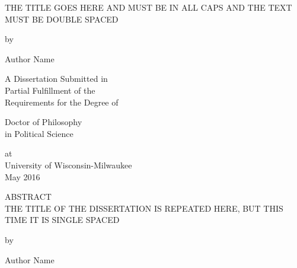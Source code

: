 \documentclass[12pt]{article}
\begin{document}

\doublespacing
\thispagestyle{empty}

\begin{center}
THE TITLE GOES HERE AND MUST BE IN ALL CAPS AND THE TEXT MUST BE DOUBLE SPACED
\end{center}

\begin{center}
by\\
\end{center}

\begin{center}
Author Name\\
\end{center}

\begin{center}
A Dissertation Submitted in\\
Partial Fulfillment of the\\
Requirements for the Degree of\\
\end{center}

\begin{center}
Doctor of Philosophy\\
in Political Science\\
\end{center}

\begin{center}
at\\
University of Wisconsin-Milwaukee\\
May 2016
\end{center}

\newpage
\thispagestyle{plain}

\singlespacing
\begin{center}
ABSTRACT\\
THE TITLE OF THE DISSERTATION IS REPEATED HERE, BUT THIS TIME IT IS SINGLE SPACED
\end{center}

\doublespacing
\begin{center}
by\\
\end{center}

\begin{center}
Author Name\\
\end{center}
\end{document}
